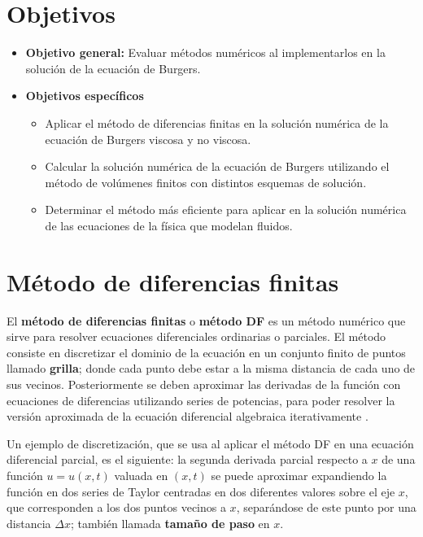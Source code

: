 \documentclass[12pt]{article}
\begin{document}
	
	\section{Objetivos}
	\begin{itemize}
		\item \textbf{Objetivo general:} Evaluar métodos numéricos al implementarlos en la solución de la ecuación de Burgers.
		\item  \textbf{Objetivos específicos}
		\begin{itemize}
			\item Aplicar el método de diferencias finitas en la solución numérica de la ecuación de Burgers viscosa y no viscosa.
			\item Calcular la solución numérica de la ecuación de Burgers utilizando el método de volúmenes finitos con distintos esquemas de solución.
			\item Determinar el método más eficiente para aplicar en la solución numérica de las ecuaciones de la física que modelan fluidos.
		\end{itemize}
	\end{itemize}
	\clearpage
	
	\section{Método de diferencias finitas}
	El \textbf{método de diferencias finitas} o \textbf{método DF} es un método numérico que sirve para resolver ecuaciones diferenciales ordinarias o parciales. El método consiste en discretizar el dominio de la ecuación en un conjunto finito de puntos llamado \textbf{grilla}; donde cada punto debe estar a la misma distancia de cada uno de sus vecinos. Posteriormente se deben aproximar las derivadas de la función con ecuaciones de diferencias utilizando series de potencias, para poder resolver la versión aproximada de la ecuación diferencial algebraica iterativamente \cite{devries2011first}.
	
	Un ejemplo de discretización, que se usa al aplicar el método DF en una ecuación diferencial parcial, es el siguiente: la segunda derivada parcial respecto a $x$ de una función $u = u(x,t)$ valuada en $(x,t)$ se puede aproximar expandiendo la función en dos series de Taylor centradas en dos diferentes valores sobre el eje $x$, que corresponden a los dos puntos vecinos a $x$, separándose de este punto por una distancia $\Delta x$; también llamada \textbf{tamaño de paso} en $x$. 
	
\end{document}
